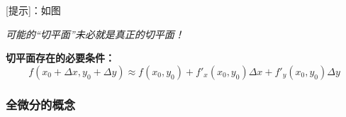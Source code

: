 [提示]：如图
\begin{center}
	\quad{}
	
	{\it 可能的“切平面”未必就是真正的切平面！}
\end{center}

\begin{thx}
	{\bf 切平面存在的必要条件：}
	$$f(x_0+\Delta x,y_0+\Delta y)\approx f(x_0,y_0)+f'_x(x_0,y_0)\Delta
	x+f'_y(x_0,y_0)\Delta y$$
\end{thx}

\subsubsection{全微分的概念}

